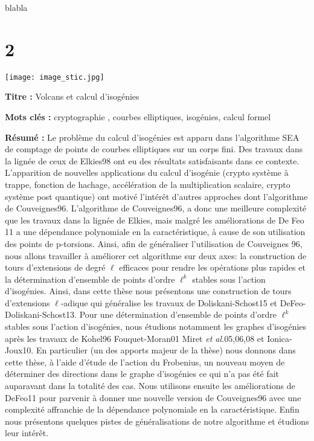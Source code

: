\documentclass[a4paper, titlepage, 12pt]{book}
\makeatletter
\newcommand*{\cleartoleftpage}{%
  \clearpage
    \if@twoside
    \ifodd\c@page
      \hbox{}\newpage
      \if@twocolumn
        \hbox{}\newpage
      \fi
    \fi
  \fi
}
\newcommand{\titre}{Volcans et calcul d'isogénies}
\makeatother
\begin{document}
blabla

\chapter{2}



\cleartoleftpage
\pagestyle{empty}
\texttt{[image: image\_stic.jpg]}

\vspace{1ex}

\begin{breakbox}

\noindent\textbf{Titre : }\titre

\vspace{2ex}

\noindent\textbf{Mots clés : }cryptographie , courbes elliptiques, isogénies, 
calcul formel

\begin{multicols}{2}
\noindent\textbf{Résumé : }
Le problème du calcul d'isogénies est apparu dans l'algorithme SEA de comptage
de points de courbes elliptiques sur un corps fini. Des travaux dans la lignée de ceux de 
Elkies98 ont eu des résultats satisfaisants dans ce contexte. L'apparition de nouvelles applications du calcul d'isogénie (crypto système à trappe, fonction de hachage, accélération de la multiplication scalaire, crypto système post quantique) ont motivé l’intérêt d'autres approches dont l'algorithme de Couveignes96.  L'algorithme de Couveignes96, a donc une meilleure complexité que les travaux dans la lignée de Elkies, mais malgré les améliorations de De Feo 11 a une dépendance polynomiale en la caractéristique, à cause de son utilisation des points de p-torsions. Ainsi, afin de généraliser l'utilisation de Couveignes 96, nous allons travailler à améliorer cet algorithme sur deux axes: la construction de tours d'extensions de degré $\ell$ efficaces pour rendre les opérations plus rapides et la détermination d'ensemble de points d'ordre $\ell^k$ stables sous l'action d'isogénies. Ainsi, dans cette thèse nous présentons une construction de tours d'extensions $\ell$-adique qui généralise les travaux de Doliskani-Schost15 et DeFeo-Doliskani-Schost13. Pour une détermination d'ensemble de points d'ordre $\ell^k$ stables sous l'action d'isogénies, nous étudions notamment les graphes d'isogénies après les travaux de Kohel96 Fouquet-Moran01 Miret \emph{et al.}05,06,08 et Ionica-Joux10. En particulier (un des apports majeur de la thèse) nous donnons dans cette thèse, à l'aide d'étude de l'action du Frobenius, un nouveau moyen de déterminer des directions dans le graphe d'isogénies ce qui n'a pas été fait auparavant dans la totalité des cas. Nous utilisons ensuite les améliorations de DeFeo11 pour parvenir à donner une nouvelle version de Couveignes96 avec une complexité affranchie de la dépendance polynomiale en la caractéristique. Enfin nous présentons quelques pistes de généralisations de notre algorithme et étudions leur intérêt.
\end{multicols}
\end{breakbox}
\end{document}
